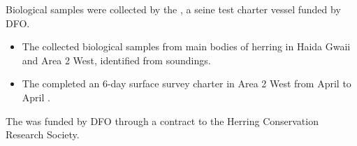 Biological samples were collected by the ,
a seine test charter vessel funded by DFO.

\begin{itemize}

\item The  collected biological samples
 from main bodies of herring in Haida Gwaii and Area 2 West,
 identified from soundings.

\item The  completed an 6-day surface survey charter
in Area 2 West from April  to April .

\end{itemize}

The  was funded by DFO through a contract to
the Herring Conservation Research Society.
